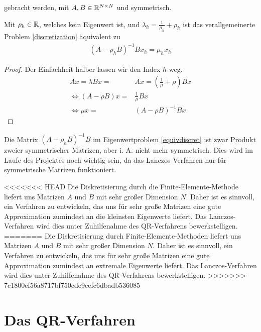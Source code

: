 \documentclass{article}
\begin{document}
\begin{theorem}
gebracht werden, mit $A, B \in \mathbb{R}^{N \times N}$ und symmetrisch.

\begin{lemma}\label{lemma_1_3}
	Mit $\rho_h \in \mathbb{R}$, welches kein Eigenwert ist, und $\lambda_h = \frac{1}{\mu_h} + \rho_h$ ist das verallgemeinerte Problem \ref{discretization} äquivalent  zu
	\begin{align} \label{equivdiscret}
		(A - \rho_h B)^{-1} B x_h = \mu_h x_h
	\end{align}
\end{lemma}

\begin{proof}
	Der Einfachheit halber lassen wir den Index $h$ weg.
	\begin{align*}
		A x = \lambda B x =& A x = (\frac{1}{\mu} + \rho) B x \\
		\Leftrightarrow (A - \rho B)x =& \frac{1}{\mu} B x \\
		\Leftrightarrow \mu x =& (A - \rho B)^{-1}B x
	\end{align*}
\end{proof}

\begin{remark}\label{remark_1_4}
	Die Matrix $(A - \rho_h B)^{-1} B$ im Eigenwertproblem \ref{equivdiscret} ist zwar Produkt zweier symmetrischer Matrizen, aber i. A. nicht mehr symmetrisch. Dies wird im Laufe des Projektes noch wichtig sein, da das Lanczos-Verfahren nur für symmetrische Matrizen funktioniert.
\end{remark}

<<<<<<< HEAD
Die Diskretisierung durch die Finite-Elemente-Methode liefert uns Matrizen $A$ und $B$ mit sehr großer Dimension $N$. Daher ist es sinnvoll, ein Verfahren zu entwickeln, das uns für sehr große Matrizen eine gute Approximation zumindest an die kleinsten Eigenwerte liefert. Das Lanczos-Verfahren wird dies unter Zuhilfenahme des QR-Verfahrens bewerkstelligen.
=======
Die Diskretisierung durch Finite-Elemente-Methoden liefert uns Matrizen $A$ und $B$ mit sehr großer Dimension $N$. Daher ist es sinnvoll, ein Verfahren zu entwickeln, das uns für sehr große Matrizen eine gute Approximation zumindest an extremale Eigenwerte liefert. Das Lanczos-Verfahren wird dies unter Zuhilfenahme des QR-Verfahrens bewerkstelligen.
>>>>>>> 7c1800ef56a8717bf750cde9cefc6dbadb536085

\section{Das QR-Verfahren}


\end{theorem}
\end{document}
